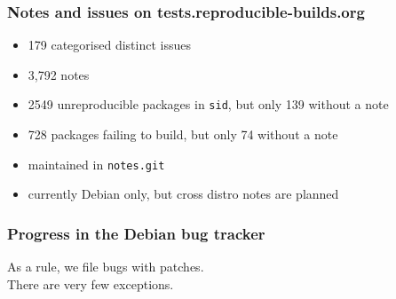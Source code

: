 \documentclass[14pt,aspectratio=169]{beamer}
\begin{document}
\begin{frame}
 \frametitle{Notes and issues on tests.reproducible-builds.org}

 \begin{itemize}
  \item 179 categorised distinct issues
  \item 3,792 notes
  \item 2549 unreproducible packages in \texttt{sid}, but only 139 without a note
  \item 728 packages failing to build, but only 74 without a note
  \item maintained in \texttt{notes.git}
  \item currently Debian only, but cross distro notes are planned
 \end{itemize}
\end{frame}



\begin{frame}
 \frametitle{Progress in the Debian bug tracker}
 \begin{center}
  \footnotesize{As a rule, we file bugs with patches. \\
  There are very few exceptions.}
  \vfill
 \end{center}
\end{frame}
\end{document}
